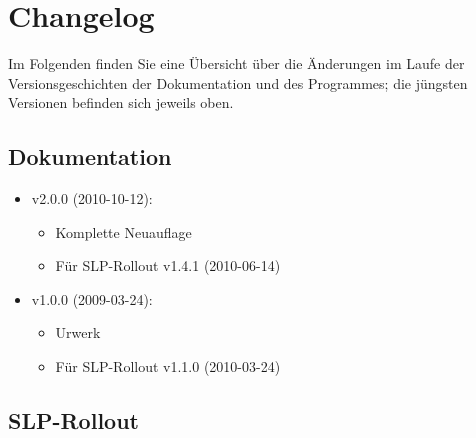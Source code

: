 \chapter{Changelog}\label{chap:changelog}

Im Folgenden finden Sie eine Übersicht über die Änderungen im Laufe der Versionsgeschichten der Dokumentation und des Programmes; die jüngsten Versionen befinden sich jeweils oben.

\section{Dokumentation}

\begin{itemize}

\item v2.0.0 (2010-10-12):
\begin{itemize}
\item Komplette Neuauflage
\item Für SLP-Rollout v1.4.1 (2010-06-14)
\end{itemize}

\item v1.0.0 (2009-03-24):
\begin{itemize}
\item Urwerk
\item Für SLP-Rollout v1.1.0 (2010-03-24)
\end{itemize}

\end{itemize}

\section{SLP-Rollout}

